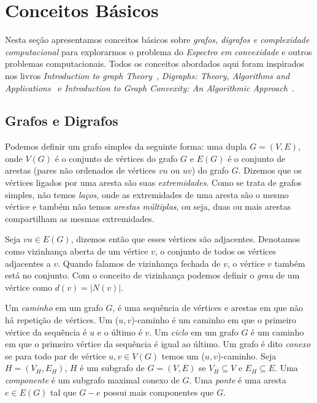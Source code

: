 \chapter{Conceitos Básicos}\label{2-conceitosbasicos}

Nesta seção apresentamos conceitos básicos sobre \textit{grafos, digrafos e complexidade computacional} para explorarmos o problema do \emph{Espectro em convexidade} e outros problemas computacionais. Todos os conceitos abordados aqui foram inspirados nos livros \textit{Introduction to graph Theory}~\cite{west2001introduction}, \textit{Digraphs: Theory, Algorithms and Applications}~\cite{bang2001} e \textit{Introduction to Graph Convexity: An Algorithmic Approach}~\cite{julio}.

\section{Grafos e Digrafos}

Podemos definir um grafo simples da seguinte forma: uma dupla $G=(V,E)$, onde $V(G)$ é o conjunto de vértices do grafo $G$ e $E(G)$ é o conjunto de arestas (pares não ordenados de vértices $vu$ ou $uv$) do grafo $G$. Dizemos que os vértices ligados por uma aresta são suas \emph{extremidades}. Como se trata de grafos simples, não temos \emph{laços}, onde as extremidades de uma aresta são o mesmo vértice e também não temos \emph{arestas múltiplas}, ou seja, duas ou mais arestas compartilham as mesmas extremidades.

Seja $vu \in E(G)$, dizemos então que esses vértices são adjacentes. Denotamos como vizinhança aberta de um vértice $v$, o conjunto de todos os vértices adjacentes a $v$. Quando falamos de vizinhança fechada de $v$, o vértice $v$ também está no conjunto. Com o conceito de vizinhança podemos definir o \emph{grau} de um vértice como $d(v) = |N(v)|$.

Um \emph{caminho} em um grafo $G$, é uma sequência de vértices e arestas em que não há repetição de vértices. Um ($u,v$)-caminho é um caminho em que o primeiro vértice da sequência é $u$ e o último é $v$. Um \emph{ciclo} em um grafo $G$ é um caminho em que o primeiro vértice da sequência é igual ao último. Um grafo é dito \emph{conexo} se para todo par de vértice $u,v \in V(G)$ temos um ($u,v$)-caminho. Seja $H = (V_H,E_H)$, $H$ é um subgrafo de $G=(V,E)$ se $V_H \subseteq V$ e $E_H \subseteq E$. Uma \emph{componente} é um subgrafo maximal conexo de $G$. Uma \emph{ponte} é uma aresta $e \in E(G)$ tal que $G-e$ possui mais componentes que $G$.


